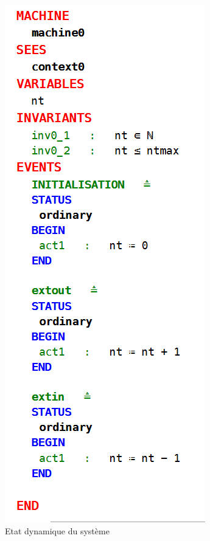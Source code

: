 \begin{figure}[H]
	\begin{center}	
		\includegraphics[scale=0.8]{images/mac0}
		\caption{Etat dynamique du système}
		\label{mac0}
	\end{center}
\end{figure}


